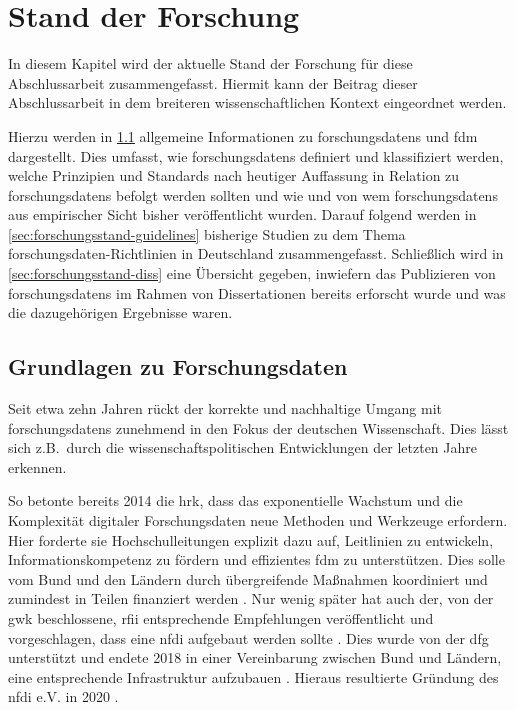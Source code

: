 \chapter{Stand der Forschung}\label{ch:forschungsstand}
In diesem Kapitel wird der aktuelle Stand der Forschung für diese Abschlussarbeit zusammengefasst. 
Hiermit kann der Beitrag dieser Abschlussarbeit in dem breiteren wissenschaftlichen Kontext eingeordnet werden.

Hierzu werden in \cref{sec:forschungsstand-basics} allgemeine Informationen zu \glspl{forschungsdaten} und \gls{fdm} dargestellt.
Dies umfasst, wie \glspl{forschungsdaten} definiert und klassifiziert werden, welche Prinzipien und Standards nach heutiger Auffassung in Relation zu \glspl{forschungsdaten} befolgt werden sollten und wie und von wem \glspl{forschungsdaten} aus empirischer Sicht bisher veröffentlicht wurden.
Darauf folgend werden in \cref{sec:forschungsstand-guidelines} bisherige Studien zu dem Thema \gls{forschungsdaten}-Richtlinien in Deutschland zusammengefasst.
Schließlich wird in \cref{sec:forschungsstand-diss} eine Übersicht gegeben, inwiefern das Publizieren von \glspl{forschungsdaten} im Rahmen von Dissertationen bereits erforscht wurde und was die dazugehörigen Ergebnisse waren.

\section{Grundlagen zu Forschungsdaten}\label{sec:forschungsstand-basics}
Seit etwa zehn Jahren rückt der korrekte und nachhaltige Umgang mit \glspl{forschungsdaten} zunehmend in den Fokus der deutschen Wissenschaft.
Dies lässt sich z.B.~durch die wissenschaftspolitischen Entwicklungen der letzten Jahre erkennen.

So betonte bereits 2014 die \gls{hrk}, dass das exponentielle Wachstum und die Komplexität digitaler Forschungsdaten neue Methoden und Werkzeuge erfordern.
Hier forderte sie Hochschulleitungen explizit dazu auf, Leitlinien zu entwickeln, Informationskompetenz zu fördern und effizientes \gls{fdm} zu unterstützen.
Dies solle vom Bund und den Ländern durch übergreifende Maßnahmen koordiniert und zumindest in Teilen finanziert werden \autocite{hrk-fdm}.
Nur wenig später hat auch der, von der \gls{gwk} beschlossene, \gls{rfii} entsprechende Empfehlungen veröffentlicht und vorgeschlagen, dass eine \gls{nfdi} aufgebaut werden sollte \autocite{rfii2016}.
Dies wurde von der \gls{dfg} unterstützt \autocite{dfg-positionspapier} und endete 2018 in einer Vereinbarung zwischen Bund und Ländern, eine entsprechende Infrastruktur aufzubauen \autocite{nfdi-agreement}.
Hieraus resultierte Gründung des \gls{nfdi} e.V. in 2020 \autocite{nfdi-foundation}.


